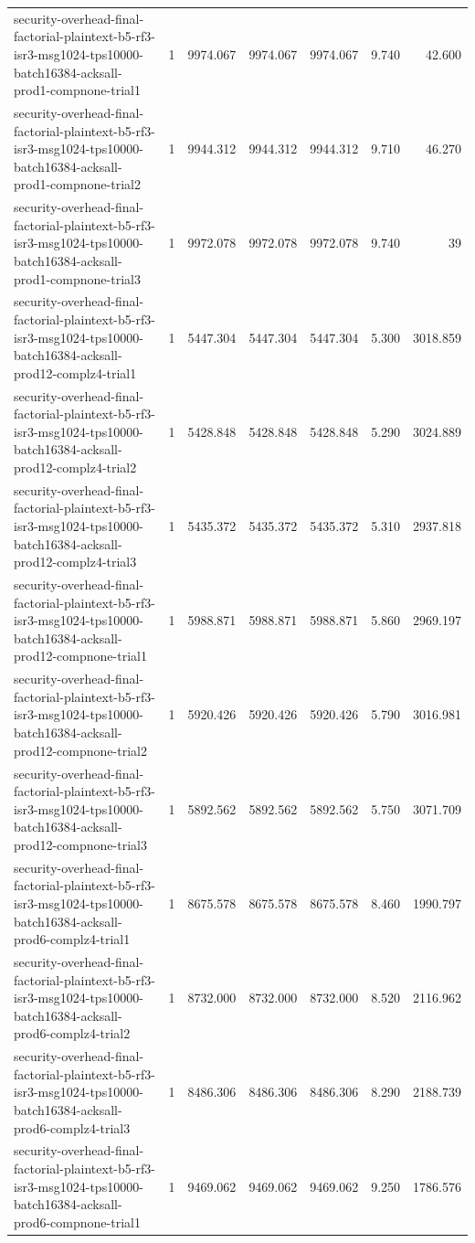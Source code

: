 \begin{tabular}{lrrrrrr}
security-overhead-final-factorial-plaintext-b5-rf3-isr3-msg1024-tps10000-batch16384-acksall-prod1-compnone-trial1 & 1 & 9974.067 & 9974.067 & 9974.067 & 9.740 & 42.600 \\
security-overhead-final-factorial-plaintext-b5-rf3-isr3-msg1024-tps10000-batch16384-acksall-prod1-compnone-trial2 & 1 & 9944.312 & 9944.312 & 9944.312 & 9.710 & 46.270 \\
security-overhead-final-factorial-plaintext-b5-rf3-isr3-msg1024-tps10000-batch16384-acksall-prod1-compnone-trial3 & 1 & 9972.078 & 9972.078 & 9972.078 & 9.740 & 39 \\
security-overhead-final-factorial-plaintext-b5-rf3-isr3-msg1024-tps10000-batch16384-acksall-prod12-complz4-trial1 & 1 & 5447.304 & 5447.304 & 5447.304 & 5.300 & 3018.859 \\
security-overhead-final-factorial-plaintext-b5-rf3-isr3-msg1024-tps10000-batch16384-acksall-prod12-complz4-trial2 & 1 & 5428.848 & 5428.848 & 5428.848 & 5.290 & 3024.889 \\
security-overhead-final-factorial-plaintext-b5-rf3-isr3-msg1024-tps10000-batch16384-acksall-prod12-complz4-trial3 & 1 & 5435.372 & 5435.372 & 5435.372 & 5.310 & 2937.818 \\
security-overhead-final-factorial-plaintext-b5-rf3-isr3-msg1024-tps10000-batch16384-acksall-prod12-compnone-trial1 & 1 & 5988.871 & 5988.871 & 5988.871 & 5.860 & 2969.197 \\
security-overhead-final-factorial-plaintext-b5-rf3-isr3-msg1024-tps10000-batch16384-acksall-prod12-compnone-trial2 & 1 & 5920.426 & 5920.426 & 5920.426 & 5.790 & 3016.981 \\
security-overhead-final-factorial-plaintext-b5-rf3-isr3-msg1024-tps10000-batch16384-acksall-prod12-compnone-trial3 & 1 & 5892.562 & 5892.562 & 5892.562 & 5.750 & 3071.709 \\
security-overhead-final-factorial-plaintext-b5-rf3-isr3-msg1024-tps10000-batch16384-acksall-prod6-complz4-trial1 & 1 & 8675.578 & 8675.578 & 8675.578 & 8.460 & 1990.797 \\
security-overhead-final-factorial-plaintext-b5-rf3-isr3-msg1024-tps10000-batch16384-acksall-prod6-complz4-trial2 & 1 & 8732.000 & 8732.000 & 8732.000 & 8.520 & 2116.962 \\
security-overhead-final-factorial-plaintext-b5-rf3-isr3-msg1024-tps10000-batch16384-acksall-prod6-complz4-trial3 & 1 & 8486.306 & 8486.306 & 8486.306 & 8.290 & 2188.739 \\
security-overhead-final-factorial-plaintext-b5-rf3-isr3-msg1024-tps10000-batch16384-acksall-prod6-compnone-trial1 & 1 & 9469.062 & 9469.062 & 9469.062 & 9.250 & 1786.576 \\

\end{tabular}
